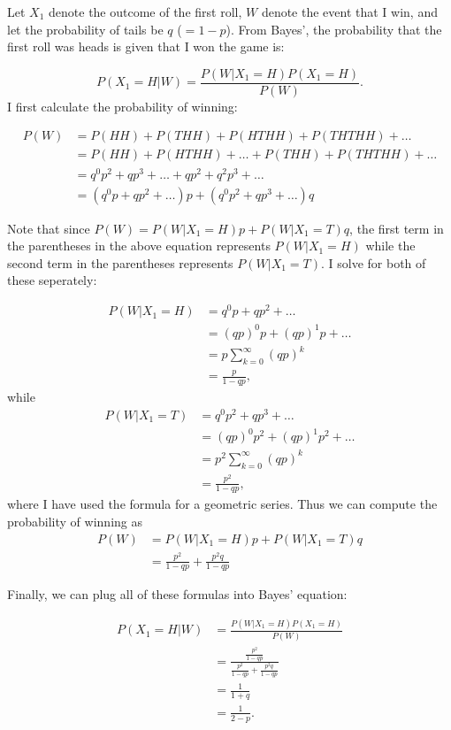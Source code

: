 \begin{problem}{35} Let $X_1$ denote the outcome of the first roll, $W$ denote the event that I win, and let the probability of tails be $q$ ($=1-p$).  From Bayes', the probability that the first roll was heads is given that I won the game is:

\begin{equation*}
P(X_1 =H|W) = \frac{P(W|X_1 =H) P(X_1 =H)}{P(W)}.
\end{equation*}
I first calculate the probability of winning:

\begin{align*}
P(W) &= P(HH)+P(THH)+P(HTHH)+P(THTHH) + \ldots \\
& = P(HH)+P(HTHH)+ \ldots+P(THH)+P(THTHH)+ \ldots \\
&= q^0p^2+qp^3+\ldots +qp^2+q^2p^3 +\ldots \\
& = (q^0p+qp^2+\ldots)p +(q^0 p^2+q p^3 +\ldots)q 
\end{align*}

Note that since $P(W) = P(W|X_1=H)p+P(W|X_1=T)q$, the first term in the parentheses in the above equation represents $P(W|X_1=H)$ while the second term in the parentheses represents $P(W|X_1=T)$.  I solve for both of these seperately:

\begin{align*}
P(W|X_1=H) &= q^0p+qp^2+\ldots \\
&= (qp)^0 p+ (qp)^1 p+\ldots \\
& = p\sum_{k=0}^\infty{(qp)^k} \\
&=\frac{p}{1-qp},
\end{align*}
while
\begin{align*}
P(W|X_1=T) &= q^0 p^2+q p^3 +\ldots \\
&= (qp)^0 p^2+ (qp)^1 p^2+\ldots \\
& = p^2\sum_{k=0}^\infty{(qp)^k} \\
&=\frac{p^2}{1-qp},
\end{align*}
where I have used the formula for a geometric series.  Thus we can compute the probability of winning as 
\begin{align*}
P(W) &= P(W|X_1=H)p+P(W|X_1=T)q \\
& = \frac{p^2}{1-qp}+\frac{p^2q}{1-qp}
\end{align*}

Finally, we can plug all of these formulas into Bayes' equation:

\begin{align*}
P(X_1 =H|W) &= \frac{P(W|X_1 =H) P(X_1 =H)}{P(W)} \\
& =\frac{ \frac{p^2}{1-qp}}{\frac{p^2}{1-qp}+\frac{p^2q}{1-qp}} \\
& = \frac{1}{1+q} \\
& = \frac{1}{2-p}.
\end{align*}

\end{problem}

